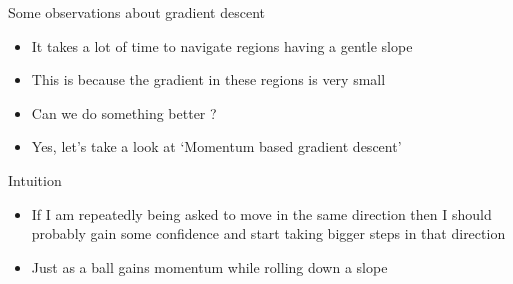 \begin{frame}
\end{frame}

\begin{frame}
	\begin{overlayarea}{\textwidth}{\textheight}
		\begin{block}{Some observations about gradient descent}
			\begin{itemize}\justifying
				\item<1-> It takes a lot of time to navigate regions having a gentle slope
				\item<2-> This is because the gradient in these regions is very small
				\item<3-> Can we do something better ?
				\item<4-> Yes, let's take a look at `Momentum based gradient descent'
			\end{itemize}
		\end{block}
	\end{overlayarea}
\end{frame}

\begin{frame}
	\begin{overlayarea}{\textwidth}{\textheight}
		\begin{block}{Intuition}
			\begin{itemize}\justifying
				\item<1-> If I am repeatedly being asked to move in the same direction then I should probably gain some confidence and start taking bigger steps in that direction
				\item<2-> Just as a ball gains momentum while rolling down a slope
			\end{itemize}
		\end{block}
		
	\end{overlayarea}
\end{frame}

